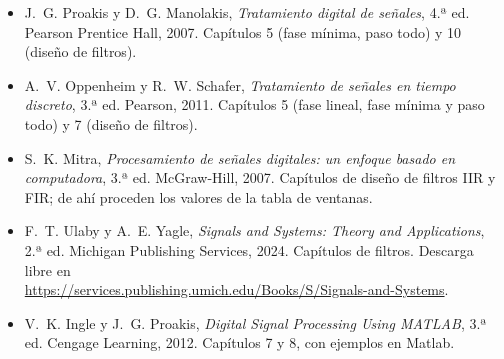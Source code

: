 \documentclass[11pt,a4paper]{scrartcl}
\begin{document}
\begin{itemize}
  \item J.~G. Proakis y D.~G. Manolakis, \emph{Tratamiento digital de señales}, 4.ª ed. Pearson Prentice Hall, 2007. Capítulos 5 (fase mínima, paso todo) y 10 (diseño de filtros).
  \item A.~V. Oppenheim y R.~W. Schafer, \emph{Tratamiento de señales en tiempo discreto}, 3.ª ed. Pearson, 2011. Capítulos 5 (fase lineal, fase mínima y paso todo) y 7 (diseño de filtros).
  \item S.~K. Mitra, \emph{Procesamiento de señales digitales: un enfoque basado en computadora}, 3.ª ed. McGraw-Hill, 2007. Capítulos de diseño de filtros IIR y FIR; de ahí proceden los valores de la tabla de ventanas.
  \item F.~T. Ulaby y A.~E. Yagle, \emph{Signals and Systems: Theory and Applications}, 2.ª ed. Michigan Publishing Services, 2024. Capítulos de filtros. Descarga libre en\\ \url{https://services.publishing.umich.edu/Books/S/Signals-and-Systems}.
  \item V.~K. Ingle y J.~G. Proakis, \emph{Digital Signal Processing Using MATLAB}, 3.ª ed. Cengage Learning, 2012. Capítulos 7 y 8, con ejemplos en Matlab.
\end{itemize}
\end{document}
